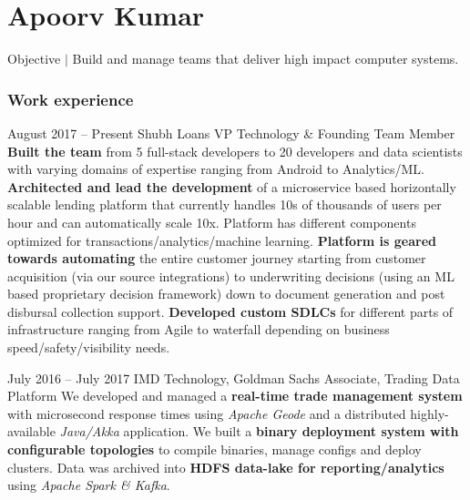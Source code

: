 \documentclass{tccv}
\begin{document}
\part{Apoorv Kumar}
	 {\selectfont\large Objective $\vert$ \selectfont\large Build and manage teams that deliver high impact computer systems.}
     
\section{Work experience}


\begin{eventlist}
\item{August 2017 -- Present}
	 {Shubh Loans}
	 {VP Technology \& Founding Team Member}
\textbf{Built the team} from 5 full-stack developers to 20 developers and data scientists with varying domains of expertise ranging from Android to Analytics/ML. \newline
\textbf{Architected and lead the development} of a microservice based horizontally scalable lending platform that currently handles 10s of thousands of users per hour and can automatically scale 10x. Platform has different components optimized for transactions/analytics/machine learning.\newline
\textbf{Platform is geared towards automating} the entire customer journey starting from customer acquisition (via our source integrations) to underwriting decisions (using an ML based proprietary decision framework) down to document generation and post disbursal collection support.\newline
\textbf{Developed custom SDLCs} for different parts of infrastructure ranging from Agile to waterfall depending on business speed/safety/visibility needs.


\item{July 2016 -- July 2017}
     {IMD Technology, Goldman Sachs}
     {Associate, Trading Data Platform}
     We developed and managed a \textbf{real-time trade management system} with microsecond response times using \textit{Apache Geode} and a distributed highly-available \textit{Java/Akka} application. \newline
     We built a \textbf{binary deployment system with configurable topologies} to compile binaries, manage configs and deploy clusters. Data was archived into \textbf{HDFS data-lake for reporting/analytics} using \textit{Apache Spark \& Kafka}.



\end{eventlist}
\end{document}
